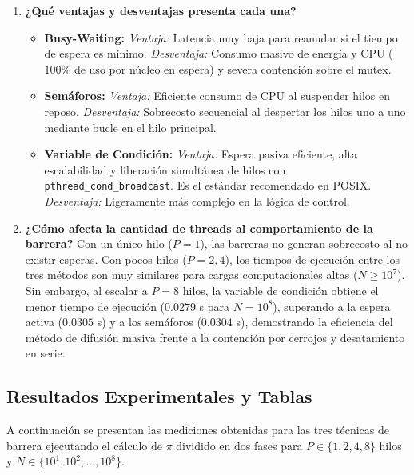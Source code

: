 \documentclass[11pt,a4paper]{article}
\begin{document}
\begin{enumerate}
    \item \textbf{¿Qué ventajas y desventajas presenta cada una?}
    \begin{itemize}
        \item \textbf{Busy-Waiting:}
        \textit{Ventaja:} Latencia muy baja para reanudar si el tiempo de espera es mínimo.
        \textit{Desventaja:} Consumo masivo de energía y CPU ($100\%$ de uso por núcleo en espera) y severa contención sobre el mutex.
        \item \textbf{Semáforos:}
        \textit{Ventaja:} Eficiente consumo de CPU al suspender hilos en reposo.
        \textit{Desventaja:} Sobrecosto secuencial al despertar los hilos uno a uno mediante bucle en el hilo principal.
        \item \textbf{Variable de Condición:}
        \textit{Ventaja:} Espera pasiva eficiente, alta escalabilidad y liberación simultánea de hilos con \texttt{pthread\_cond\_broadcast}. Es el estándar recomendado en POSIX.
        \textit{Desventaja:} Ligeramente más complejo en la lógica de control.
    \end{itemize}

    \item \textbf{¿Cómo afecta la cantidad de threads al comportamiento de la barrera?}
    Con un único hilo ($P=1$), las barreras no generan sobrecosto al no existir esperas. Con pocos hilos ($P=2, 4$), los tiempos de ejecución entre los tres métodos son muy similares para cargas computacionales altas ($N \ge 10^7$). Sin embargo, al escalar a $P=8$ hilos, la variable de condición obtiene el menor tiempo de ejecución ($0.0279$ s para $N=10^8$), superando a la espera activa ($0.0305$ s) y a los semáforos ($0.0304$ s), demostrando la eficiencia del método de difusión masiva frente a la contención por cerrojos y desatamiento en serie.
\end{enumerate}

\subsection{Resultados Experimentales y Tablas}

A continuación se presentan las mediciones obtenidas para las tres técnicas de barrera ejecutando el cálculo de \texorpdfstring{$\pi$}{pi} dividido en dos fases para $P \in \{1, 2, 4, 8\}$ hilos y $N \in \{10^1, 10^2, \dots, 10^8\}$.
\end{document}
